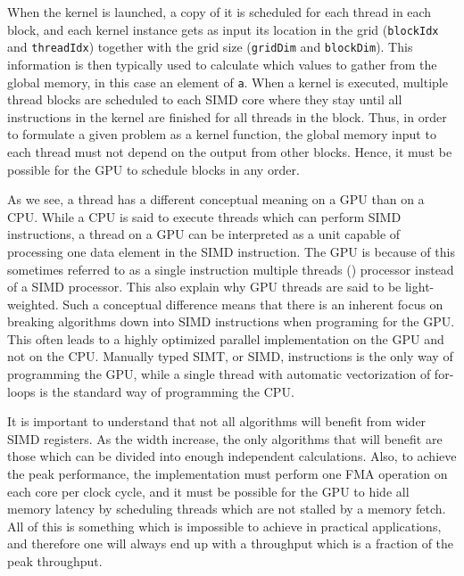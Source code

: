 When the kernel is launched, a copy of it is scheduled for each thread in each block, and each kernel instance gets as input its location in the grid (\texttt{blockIdx} and \texttt{threadIdx}) together with the grid size (\texttt{gridDim} and \texttt{blockDim}). This information is then typically used to calculate which values to gather from the global memory, in this case an element of \texttt{a}. %
When a kernel is executed, multiple thread blocks are scheduled to each SIMD core where they stay until all instructions in the kernel are finished for all threads in the block. Thus,  in order to formulate a given problem as a kernel function, the global memory input to each thread must not depend on the output from other blocks. Hence, it must be possible for the GPU to schedule blocks in any order. 

As we see, a thread has a different conceptual meaning on a GPU than on a CPU.  While a CPU is said to execute threads which can perform SIMD instructions, a thread on a GPU can be interpreted as a unit capable of processing one data element in the SIMD instruction. The GPU is because of this sometimes referred to as a single instruction multiple threads () processor instead of a SIMD processor. This also explain why GPU threads are said to be light-weighted. Such a conceptual difference means that there is an inherent focus on breaking algorithms down into SIMD instructions when programing for the GPU. This often leads to a highly optimized parallel implementation on the GPU and not on the CPU. Manually typed SIMT, or SIMD, instructions is the only way of programming the GPU, while a single thread with automatic vectorization of for-loops is the standard way of programming the CPU. 

It is important to understand that not all algorithms will benefit from wider SIMD registers. As the width increase, the only algorithms that will benefit are those which can be divided into enough independent calculations. Also, to achieve the peak performance, the implementation must perform one FMA operation on each core per clock cycle, and it must be possible for the GPU to hide all memory latency by scheduling threads which are not stalled by a memory fetch. All of this is something which is impossible to achieve in practical applications, and therefore one will always end up with a throughput which is a fraction of the peak throughput.

